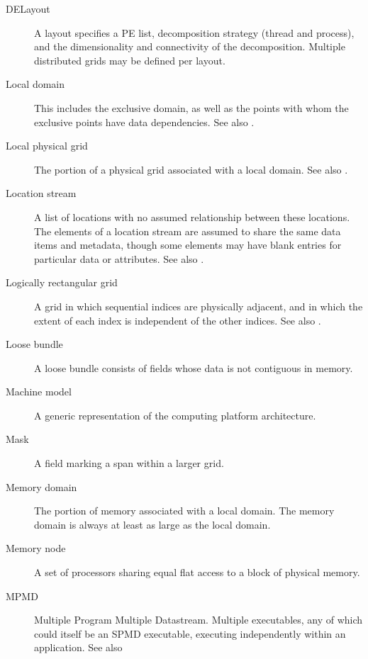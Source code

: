 \begin{description}
\item[DELayout] \label{glos:DELayout} A layout specifies a PE list, 
  decomposition strategy (thread and process), and the dimensionality 
  and connectivity of the decomposition.  Multiple distributed 
  grids may be defined per layout.

\item[Local domain] \label{glos:LocalDomain} This includes the exclusive 
  domain, as well as the points with whom the exclusive points have data 
  dependencies. See also .

\item[Local physical grid] \label{glos:LocPhysGrid} The portion of a 
  physical grid associated with a local domain.
  See also .  

\item[Location stream] \label{glos:LocStream} A list of
  locations with no assumed relationship between these locations.  The
  elements of a location stream are assumed to share the same data
  items and metadata, though some elements may have blank entries for
  particular data or attributes. See also .

\item[Logically rectangular grid] \label{glos:RecGrid} A grid in 
  which sequential indices are physically adjacent, and in which the 
  extent of each index is independent of the other indices.
  See also .

\item[Loose bundle] \label{glos:LooseBundle} A loose bundle consists of 
  fields whose data is not contiguous in memory.

\item[Machine model] A generic representation of the computing 
  platform architecture.

\item[Mask] \label{glos:Mask} A field marking a span within a larger grid.

\item[Memory domain] \label{glos:MemDomain} The portion of memory 
  associated with a local domain.  The memory domain is always at least 
  as large as the local domain.

\item[Memory node] \label{glos:Mnode} A set of processors
  sharing equal flat access to a block of physical memory.

\item[MPMD] \label{glos:MPMD} Multiple Program Multiple Datastream.
  Multiple executables, any of which could itself be an SPMD
  executable, executing independently within an application. 
  See also 


\end{description}
